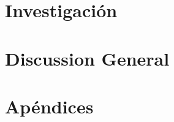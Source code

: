 \documentclass[%
    paper=A4,               %
    twoside=true,           %
    openright,              %
    parskip=half,           %
    chapterprefix=true,     %
    12pt,                   %
    headings=normal,        %
    bibliography=totoc,     %
    listof=totoc,           %
    titlepage=on,           %
    captions=tableabove,    %
    chapterprefix=false,    %
    appendixprefix=false,    %
    draft=false,            %
]{scrreprt}%
\begin{document}
\part{Investigación}
   
  
 
 
   
 

\part{Discussion General}

%
{%
\renewcommand{\bibfont}{\footnotesize}
\setlength{\biblabelsep}{0pt}
\setlength{\bibitemsep}{0.1\baselineskip plus 0.1\baselineskip}
\printbibliography
}%
\cleardoublepage




\part{Apéndices}
\appendix\cleardoublepage

\cleardoublepage



\newpage
\mbox{}

\end{document}
